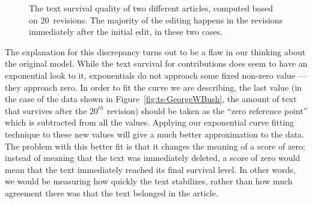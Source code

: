 \begin{figure}[tbph]
\centering
{}
\hspace{1ex}
\caption[The text survival quality graphs for two articles]{
  The text survival quality of two different articles, computed
  based on 20~revisions.
  The majority of the editing happens in the
  revisions immediately after the initial edit, in these two cases.
  \label{fig:ts-GWB-SCBB}
}
\end{figure}

The explanation for this discrepancy turns out to be a flaw in our
thinking about the original model.
While the text survival for contributions does seem to have an
exponential look to it, exponentials do not approach some fixed
non-zero value --- they approach zero.
In order to fit the curve we are describing, the last value
(in the case of the data shown in Figure~\ref{fig:ts-GeorgeWBush},
the amount of text that survives after the $20^{th}$ revision)
should be taken as the ``zero reference point'' which is subtracted
from all the values.
Applying our exponential curve fitting technique to these new values
will give a much better approximation to the data.
The problem with this better fit is that it changes the meaning of
a score of zero; instead of meaning that the text was immediately deleted,
a score of zero would mean that the text immediately reached its
final survival level.
In other words, we would be measuring how quickly the text stabilizes,
rather than how much agreement there was that the text belonged in
the article.


